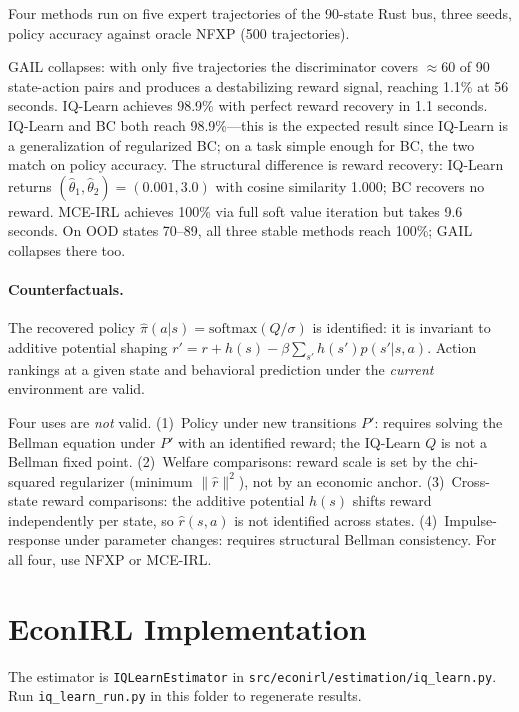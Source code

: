 \documentclass[10pt]{article}
\begin{document}


Four methods run on five expert trajectories of the 90-state Rust bus, three seeds, policy accuracy against oracle NFXP (500 trajectories).

GAIL collapses: with only five trajectories the discriminator covers ${\approx}60$ of 90 state-action pairs and produces a destabilizing reward signal, reaching 1.1\% at 56 seconds. IQ-Learn achieves 98.9\% with perfect reward recovery in 1.1 seconds. IQ-Learn and BC both reach 98.9\%---this is the expected result since IQ-Learn is a generalization of regularized BC; on a task simple enough for BC, the two match on policy accuracy. The structural difference is reward recovery: IQ-Learn returns $(\hat\theta_1,\hat\theta_2)=(0.001,3.0)$ with cosine similarity 1.000; BC recovers no reward. MCE-IRL achieves 100\% via full soft value iteration but takes 9.6 seconds. On OOD states 70--89, all three stable methods reach 100\%; GAIL collapses there too.

\paragraph{Counterfactuals.}
The recovered policy $\hat{\pi}(a|s) = \mathrm{softmax}(Q/\sigma)$ is identified: it is invariant to additive potential shaping $r' = r + h(s) - \beta\sum_{s'}h(s')p(s'|s,a)$. Action rankings at a given state and behavioral prediction under the \emph{current} environment are valid.

Four uses are \emph{not} valid. (1)~Policy under new transitions $P'$: requires solving the Bellman equation under $P'$ with an identified reward; the IQ-Learn $Q$ is not a Bellman fixed point. (2)~Welfare comparisons: reward scale is set by the chi-squared regularizer (minimum $\|\hat{r}\|^2$), not by an economic anchor. (3)~Cross-state reward comparisons: the additive potential $h(s)$ shifts reward independently per state, so $\hat{r}(s,a)$ is not identified across states. (4)~Impulse-response under parameter changes: requires structural Bellman consistency. For all four, use NFXP or MCE-IRL.


\section{EconIRL Implementation}

The estimator is \texttt{IQLearnEstimator} in \texttt{src/econirl/estimation/iq\_learn.py}. Run \texttt{iq\_learn\_run.py} in this folder to regenerate results.
\end{document}
